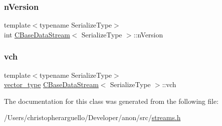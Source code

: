 \mbox{\label{class_c_base_data_stream_a9a6ab5bb4c659f3ee03dca351c9de88e}} 
\subsubsection{\texorpdfstring{n\+Version}{nVersion}}
{\footnotesize\ttfamily template$<$typename Serialize\+Type$>$ \\
int \mbox{\hyperlink{class_c_base_data_stream}{C\+Base\+Data\+Stream}}$<$ Serialize\+Type $>$\+::n\+Version}

\mbox{\label{class_c_base_data_stream_a2316d80610702632a74252c4db156990}} 
\subsubsection{\texorpdfstring{vch}{vch}}
{\footnotesize\ttfamily template$<$typename Serialize\+Type$>$ \\
\mbox{\hyperlink{class_c_base_data_stream_a035e97a3e024a8cfa4690eaca1e5e290}{vector\+\_\+type}} \mbox{\hyperlink{class_c_base_data_stream}{C\+Base\+Data\+Stream}}$<$ Serialize\+Type $>$\+::vch\hspace{0.3cm}{\ttfamily [protected]}}



The documentation for this class was generated from the following file\+:\begin{DoxyCompactItemize}
\item 
/\+Users/christopherarguello/\+Developer/anon/src/\mbox{\hyperlink{streams_8h}{streams.\+h}}\end{DoxyCompactItemize}
